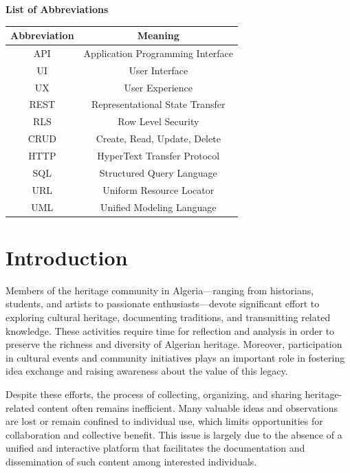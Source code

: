 \documentclass[12pt]{article}
\begin{document}
\textbf{List of Abbreviations}
\begin{table}[H]
    \centering
    \begin{tabular}{|c|c|}
        \hline
        \textbf{Abbreviation} & \textbf{Meaning} \\
        \hline
        API & Application Programming Interface \\
        \hline
        UI & User Interface \\
        \hline
        UX & User Experience \\
        \hline
        REST & Representational State Transfer \\
        \hline
        RLS & Row Level Security \\
        \hline
        CRUD & Create, Read, Update, Delete \\
        \hline
        HTTP & HyperText Transfer Protocol \\
        \hline
        SQL & Structured Query Language \\
        \hline
        URL & Uniform Resource Locator \\
        \hline
        UML & Unified Modeling Language \\
        \hline
    \end{tabular}
\end{table}


\newpage


\section{Introduction}

\vspace{0.5cm}

\hspace{0.6cm}Members of the heritage community in Algeria—ranging from historians, students, and artists to passionate enthusiasts—devote significant effort to exploring cultural heritage, documenting traditions, and transmitting related knowledge. These activities require time for reflection and analysis in order to preserve the richness and diversity of Algerian heritage. Moreover, participation in cultural events and community initiatives plays an important role in fostering idea exchange and raising awareness about the value of this legacy.

\vspace{0.5cm}

Despite these efforts, the process of collecting, organizing, and sharing heritage-related content often remains inefficient. Many valuable ideas and observations are lost or remain confined to individual use, which limits opportunities for collaboration and collective benefit. This issue is largely due to the absence of a unified and interactive platform that facilitates the documentation and dissemination of such content among interested individuals.
\end{document}
